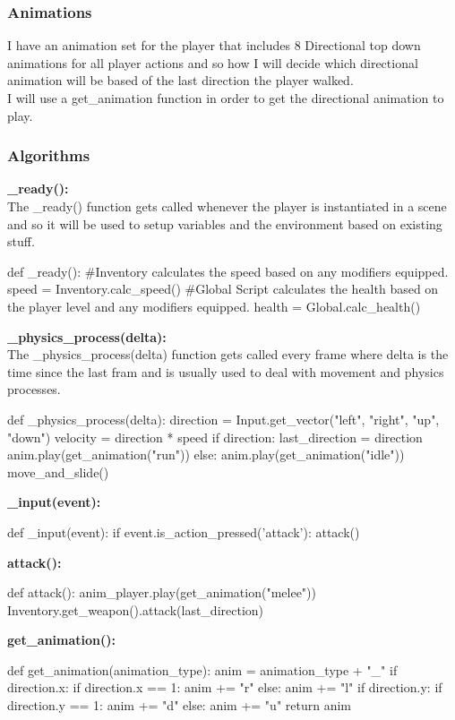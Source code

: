 \documentclass{article}
\begin{document}
        \subsubsection{Animations}
        I have an animation set for the player that includes 8 Directional top down animations for all player actions and so how I will decide which directional animation will be based of the last direction the player walked.\\
        I will use a get\_animation function in order to get the directional animation to play.\\
        \subsubsection{Algorithms}
        \textbf{\_ready():}\\
        The \_ready() function gets called whenever the player is instantiated in a scene and so it will be used to setup variables and the environment based on existing stuff.\\
        \begin{python}
def _ready():
        #Inventory calculates the speed based on any modifiers equipped.
        speed = Inventory.calc_speed() 
        #Global Script calculates the health based on the player level and any modifiers equipped.
        health = Global.calc_health()
        \end{python}
        \textbf{\_physics\_process(delta):}\\
        The \_physics\_process(delta) function gets called every frame where delta is the time since the last fram and is usually used to deal with movement and physics processes.\\
        \begin{python}
def _physics_process(delta):
   direction = Input.get_vector("left", "right", "up", "down")
   velocity = direction * speed
   if direction:
      last_direction = direction
      anim.play(get_animation("run"))
   else:
      anim.play(get_animation("idle"))
   move_and_slide()
        \end{python}
        \textbf{\_input(event):}\\
        \begin{python}
def _input(event):
   if event.is_action_pressed('attack'):
      attack()
        \end{python}
        \textbf{attack():}
        \begin{python}
def attack():
   anim_player.play(get_animation("melee"))
   Inventory.get_weapon().attack(last_direction)
        \end{python}
        \textbf{get\_animation():}
        \begin{python}
def get_animation(animation_type):
   anim = animation_type + "_"
   if direction.x:
      if direction.x == 1:
         anim += "r"
      else:
         anim += "l"
   if direction.y:
      if direction.y == 1:
         anim += "d"
      else:
         anim += "u"
   return anim
        \end{python}
\end{document}
